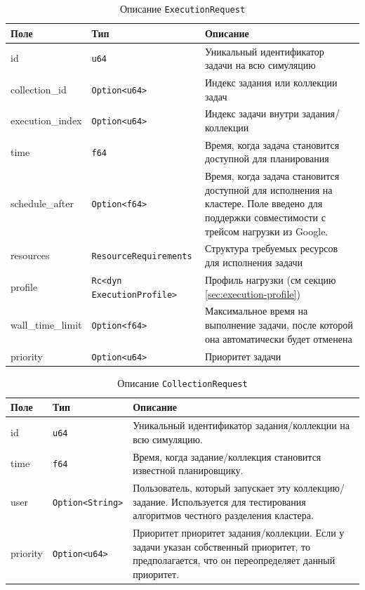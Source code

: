 \begin{table}[h]
    \centering
    \label{tab:execution_request_fields}
    \begin{tabular}{|l|l|p{8cm}|}
        \hline
        \textbf{Поле} & \textbf{Тип} & \textbf{Описание} \\
        \hline
        id & \texttt{u64} & Уникальный идентификатор задачи на всю симуляцию \\
        \hline
        collection\_id & \texttt{Option<u64>} & Индекс задания или коллекции задач  \\
        \hline
        execution\_index & \texttt{Option<u64>} & Индекс задачи внутри задания/коллекции \\
        \hline
        time & \texttt{f64} & Время, когда задача становится доступной для планирования \\
        \hline
        schedule\_after & \texttt{Option<f64>} & Время, когда задача становится доступной для исполнения на кластере. Поле введено для поддержки совместимости с трейсом нагрузки из Google. \\
        \hline
        resources & \texttt{ResourceRequirements} & Структура требуемых ресурсов для исполнения задачи \\
        \hline
        profile & \texttt{Rc<dyn ExecutionProfile>} & Профиль нагрузки (см секцию \ref{sec:execution-profile}) \\
        \hline
        wall\_time\_limit & \texttt{Option<f64>} & Максимальное время на выполнение задачи, после которой она автоматически будет отменена \\
        \hline
        priority & \texttt{Option<u64>} & Приоритет задачи \\
        \hline
    \end{tabular}
    \caption{Описание \texttt{ExecutionRequest}}
    \label{tab:execution}
\end{table}

\begin{table}[h!]
    \centering
    \begin{tabular}{|l|l|p{8cm}|}
        \hline
        \textbf{Поле} & \textbf{Тип} & \textbf{Описание} \\ 
        \hline
        id & \texttt{u64} & Уникальный идентификатор задания/коллекции на всю симуляцию. \\
        \hline
        time & \texttt{f64} & Время, когда задание/коллекция становится известной планировщику. \\
        \hline
        user & \texttt{Option<String>} & Пользователь, который запускает эту коллекцию/задание. Используется для тестирования алгоритмов честного разделения кластера. \\
        \hline
        priority & \texttt{Option<u64>} & Приоритет приоритет задания/коллекции. Если у задачи указан собственный приоритет, то предполагается, что он переопределяет данный приоритет. \\
        \hline
    \end{tabular}
    \caption{Описание \texttt{CollectionRequest}}
    \label{tab:collection}
\end{table}

